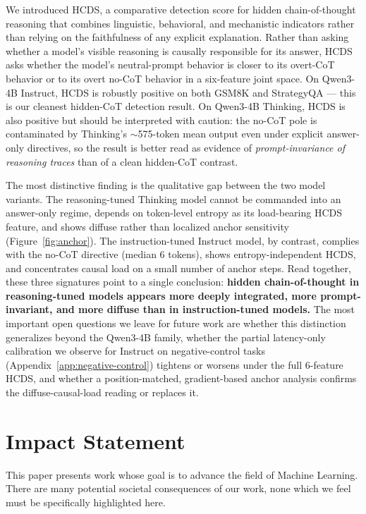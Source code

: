 \documentclass{article}
\theoremstyle{plain}
\theoremstyle{definition}
\theoremstyle{remark}
\begin{document}
We introduced HCDS, a comparative detection score for hidden chain-of-thought reasoning that combines linguistic, behavioral, and mechanistic indicators rather than relying on the faithfulness of any explicit explanation. Rather than asking whether a model's visible reasoning is causally responsible for its answer, HCDS asks whether the model's neutral-prompt behavior is closer to its overt-CoT behavior or to its overt no-CoT behavior in a six-feature joint space. On Qwen3-4B Instruct, HCDS is robustly positive on both GSM8K and StrategyQA --- this is our cleanest hidden-CoT detection result. On Qwen3-4B Thinking, HCDS is also positive but should be interpreted with caution: the no-CoT pole is contaminated by Thinking's $\sim$575-token mean output even under explicit answer-only directives, so the result is better read as evidence of \emph{prompt-invariance of reasoning traces} than of a clean hidden-CoT contrast.

The most distinctive finding is the qualitative gap between the two model variants. The reasoning-tuned Thinking model cannot be commanded into an answer-only regime, depends on token-level entropy as its load-bearing HCDS feature, and shows diffuse rather than localized anchor sensitivity (Figure~\ref{fig:anchor}). The instruction-tuned Instruct model, by contrast, complies with the no-CoT directive (median 6 tokens), shows entropy-independent HCDS, and concentrates causal load on a small number of anchor steps. Read together, these three signatures point to a single conclusion: \textbf{hidden chain-of-thought in reasoning-tuned models appears more deeply integrated, more prompt-invariant, and more diffuse than in instruction-tuned models.} The most important open questions we leave for future work are whether this distinction generalizes beyond the Qwen3-4B family, whether the partial latency-only calibration we observe for Instruct on negative-control tasks (Appendix~\ref{app:negative-control}) tightens or worsens under the full 6-feature HCDS, and whether a position-matched, gradient-based anchor analysis confirms the diffuse-causal-load reading or replaces it.

\section*{Impact Statement}

This paper presents work whose goal is to advance the field of Machine
Learning. There are many potential societal consequences of our work, none
which we feel must be specifically highlighted here.
\end{document}
